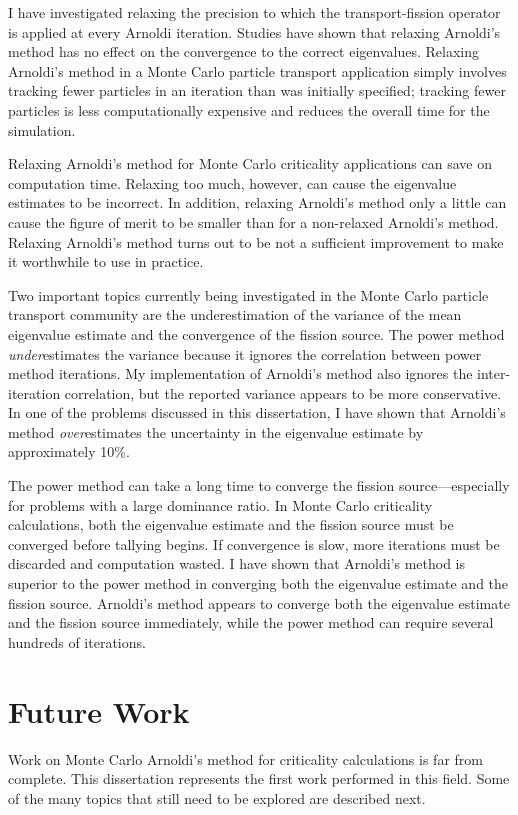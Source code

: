 I have investigated relaxing the precision to which the transport-fission operator is applied at every Arnoldi iteration.  Studies have shown that relaxing Arnoldi's method has no effect on the convergence to the correct eigenvalues.  Relaxing Arnoldi's method in a Monte Carlo particle transport application simply involves tracking fewer particles in an iteration than was initially specified; tracking fewer particles is less computationally expensive and reduces the overall time for the simulation.  

Relaxing Arnoldi's method for Monte Carlo criticality applications can save on computation time.  Relaxing too much, however,  can cause the eigenvalue estimates to be incorrect.  In addition, relaxing Arnoldi's method only a little can cause the figure of merit to be smaller than for a non-relaxed Arnoldi's method.  Relaxing Arnoldi's method turns out to be not a sufficient improvement to make it worthwhile to use in practice.  

Two important topics currently being investigated in the Monte Carlo particle transport community are the underestimation of the variance of the mean eigenvalue estimate and the convergence of the fission source.  The power method \emph{under}estimates the variance because it ignores the correlation between power method iterations.  My implementation of Arnoldi's method also ignores the inter-iteration correlation, but the reported variance appears to be more conservative.  In one of the problems discussed in this dissertation, I have shown that Arnoldi's method \emph{over}estimates the uncertainty in the eigenvalue estimate by approximately 10\%.

The power method can take a long time to converge the fission source---especially for problems with a large dominance ratio.  In Monte Carlo criticality calculations, both the eigenvalue estimate and the fission source must be converged before tallying begins.  If convergence is slow, more iterations must be discarded and computation wasted.  I have shown that Arnoldi's method is superior to the power method in converging both the eigenvalue estimate and the fission source.  Arnoldi's method appears to converge both the eigenvalue estimate and the fission source immediately, while the power method can require several hundreds of iterations.  

\section{Future Work \label{sec:FutureWork}}
Work on Monte Carlo Arnoldi's method for criticality calculations is far from complete.  This dissertation represents the first work performed in this field.  Some of the many topics that still need to be explored are described next.

